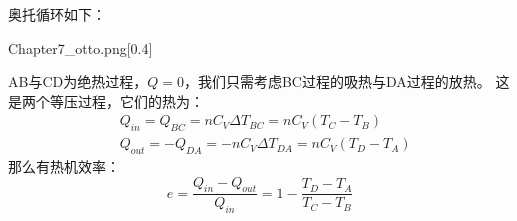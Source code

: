         \begin{prove}
            奥托循环如下：
            \begin{singlefigure}{Chapter7_otto.png}[0.4]
            \end{singlefigure}
            AB与CD为绝热过程，$Q = 0$，我们只需考虑BC过程的吸热与DA过程的放热。
            这是两个等压过程，它们的热为：
            \begin{equation}
                \begin{aligned}
                    &Q_{in} = Q_{BC} = nC_{V}\Delta T_{BC}= nC_{V}(T_{C} - T_{B})\\
                    &Q_{out} = -Q_{DA} = -nC_{V}\Delta T_{DA}= nC_{V}(T_{D} - T_{A})
                \end{aligned}
                \nonumber
            \end{equation}
            那么有热机效率：
            \begin{equation}
                e = \frac{Q_{in}-Q_{out}}{Q_{in}} = 1 - \frac{T_{D} - T_{A}}{T_{C} - T_{B}}
            \end{equation}
        \end{prove}
